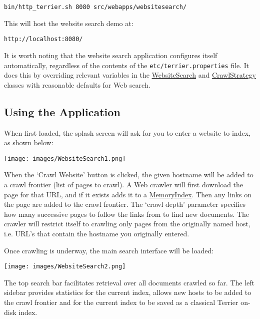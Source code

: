 \begin{verbatim}
bin/http_terrier.sh 8080 src/webapps/websitesearch/
\end{verbatim}

This will host the website search demo at:

\begin{verbatim}
http://localhost:8080/
\end{verbatim}

It is worth noting that the website search application configures itself
automatically, regardless of the contents of the
\texttt{etc/terrier.properties} file. It does this by overriding
relevant variables in the
\href{javadoc/org/terrier/services/websitesearch/WebsiteSearch.html}{WebsiteSearch}
and
\href{javadoc/org/terrier/services/websitesearch/crawler4j/CrawlStrategy.html}{CrawlStrategy}
classes with reasonable defaults for Web search.

\subsection{Using the Application}\label{using-the-application}

When first loaded, the splash screen will ask for you to enter a website
to index, as shown below:

\texttt{[image: images/WebsiteSearch1.png]}

When the `Crawl Website' button is clicked, the given hostname will be
added to a crawl frontier (list of pages to crawl). A Web crawler will
first download the page for that URL, and if it exists adds it to a
\href{javadoc/org/terrier/realtime/memory/MemoryIndex.html}{MemoryIndex}.
Then any links on the page are added to the crawl frontier. The `crawl
depth' parameter specifies how many successive pages to follow the links
from to find new documents. The crawler will restrict itself to crawling
only pages from the originally named host, i.e. URL's that contain the
hostname you originally entered.

Once crawling is underway, the main search interface will be loaded:

\texttt{[image: images/WebsiteSearch2.png]}

The top search bar facilitates retrieval over all documents crawled so
far. The left sidebar provides statistics for the current index, allows
new hosts to be added to the crawl frontier and for the current index to
be saved as a classical Terrier on-disk index.

